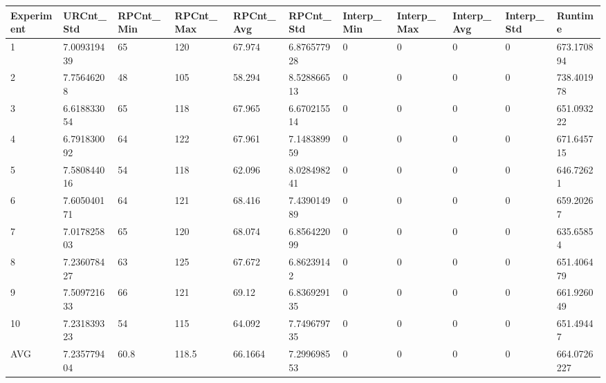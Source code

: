 \begin{table}[H]
\begin{adjustbox}{max width=380pt,keepaspectratio,angle=90}
\begin{tabular}{|l|l|l|l|l|l|l|l|l|l|l|}
				\end{tabular}	
			\end{adjustbox}
			\begin{adjustbox}{max width=380pt,keepaspectratio,angle=90}
				\begin{tabular}{|l|l|l|l|l|l|l|l|l|l|l|}
					\rowcolor[HTML]{EFEFEF} 
					\hline
					Experiment & URCnt\_Std  & RPCnt\_Min & RPCnt\_Max & RPCnt\_Avg & RPCnt\_Std  & Interp\_Min & Interp\_Max & Interp\_Avg & Interp\_Std & Runtime     \\ \hline
					1          & 7.009319439 & 65         & 120        & 67.974     & 6.876577928 & 0           & 0           & 0           & 0           & 673.170894  \\ \hline
					2          & 7.75646208  & 48         & 105        & 58.294     & 8.528866513 & 0           & 0           & 0           & 0           & 738.401978  \\ \hline
					3          & 6.618833054 & 65         & 118        & 67.965     & 6.670215514 & 0           & 0           & 0           & 0           & 651.093222  \\ \hline
					4          & 6.791830092 & 64         & 122        & 67.961     & 7.148389959 & 0           & 0           & 0           & 0           & 671.645715  \\ \hline
					5          & 7.580844016 & 54         & 118        & 62.096     & 8.028498241 & 0           & 0           & 0           & 0           & 646.72621   \\ \hline
					6          & 7.605040171 & 64         & 121        & 68.416     & 7.439014989 & 0           & 0           & 0           & 0           & 659.20267   \\ \hline
					7          & 7.017825803 & 65         & 120        & 68.074     & 6.856422099 & 0           & 0           & 0           & 0           & 635.65854   \\ \hline
					8          & 7.236078427 & 63         & 125        & 67.672     & 6.86239142  & 0           & 0           & 0           & 0           & 651.406479  \\ \hline
					9          & 7.509721633 & 66         & 121        & 69.12      & 6.836929135 & 0           & 0           & 0           & 0           & 661.926049  \\ \hline
					10         & 7.231839323 & 54         & 115        & 64.092     & 7.749679735 & 0           & 0           & 0           & 0           & 651.49447   \\ \hline\hline
					AVG        & 7.235779404 & 60.8       & 118.5      & 66.1664    & 7.299698553 & 0           & 0           & 0           & 0           & 664.0726227 \\ \hline
				\end{tabular}
			\end{adjustbox}	
		\end{table}
